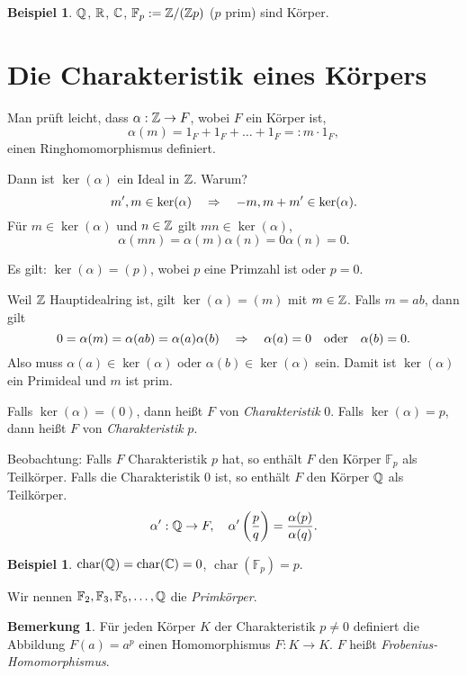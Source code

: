 \documentclass[
 a4paper,
 12pt,
 parskip=half
 ]{scrreprt}
\theoremstyle{plain}
\theoremstyle{definition}
\newtheorem{rmrk}[thm]{Bemerkung}
\newtheorem{exmp}[thm]{Beispiel}
\newtheorem*{exmp*}{Beispiel}
\DeclareMathOperator{\ch}{char}
\numberwithin{equation}{chapter}
\numberwithin{thm}{chapter}
\begin{document}
\begin{exmp}
  $\mathbb{Q}$, $\mathbb{R}$, $\mathbb{C}$, $\mathbb{F}_p := \mathbb{Z} / ( \mathbb{Z} p)$ ($p$ prim) sind Körper.
\end{exmp}

\section*{Die Charakteristik eines Körpers}

Man prüft leicht, dass $\alpha: \mathbb{Z} \to F$, wobei $F$ ein Körper ist,
\[ \alpha(m) = 1_F + 1_F + \ldots + 1_F =: m \cdot 1_F, \]
einen Ringhomomorphismus definiert.

Dann ist $\ker(\alpha)$ ein Ideal in $\mathbb{Z}$. Warum?
\[ m', m \in \ker(\alpha) \quad \Rightarrow \quad -m, m + m' \in \ker(\alpha). \]
Für $m \in \ker(\alpha)$ und $n \in \mathbb{Z}$ gilt $mn \in \ker(\alpha)$,
\[ \alpha( mn ) = \alpha(m) \alpha(n) = 0 \alpha(n) = 0. \]

Es gilt: $\ker(\alpha) = (p)$, wobei $p$ eine Primzahl ist oder $p = 0$.

Weil $\mathbb{Z}$ Hauptidealring ist, gilt $\ker(\alpha) = (m)$ mit $m \in
\mathbb{Z}$. Falls $m = ab$, dann gilt
\[ 0 = \alpha(m) = \alpha(ab) = \alpha(a) \alpha(b)
  \quad \Rightarrow \quad \alpha(a) = 0 \quad \text{oder} \quad \alpha(b) = 0. \]
Also muss $\alpha(a) \in \ker(\alpha)$ oder $\alpha(b) \in \ker(\alpha)$ sein.
Damit ist $\ker(\alpha)$ ein Primideal und $m$ ist prim.

Falls $\ker(\alpha) = (0)$, dann heißt $F$ von \emph{Charakteristik} 0. Falls
$\ker(\alpha) = p$, dann heißt $F$ von \emph{Charakteristik} $p$.

Beobachtung: Falls $F$ Charakteristik $p$ hat, so enthält $F$ den Körper
$\mathbb{F}_p$ als Teilkörper. Falls die Charakteristik 0 ist, so enthält $F$
den Körper $\mathbb{Q}$ als Teilkörper.
\[ \alpha' : \mathbb{Q} \to F, \quad
  \alpha' \left( \frac{p}{q} \right)
  = \frac{\alpha(p)}{\alpha(q)}. \]

\begin{exmp*}
  $\ch(\rat) = \ch(\complex) = 0$, $\ch(\mathbb{F}_p) = p$.
\end{exmp*}

Wir nennen $\mathbb{F}_2, \mathbb{F}_3, \mathbb{F}_5, \ldots, \mathbb{Q}$ die
\emph{Primkörper}.

\begin{rmrk}
  Für jeden Körper $K$ der Charakteristik $p \ne 0$ definiert die Abbildung
  $F(a) = a^p$ einen Homomorphismus $F: K \to K$. $F$ heißt
  \emph{Frobenius-Homomorphismus}.
\end{rmrk}
\end{document}
